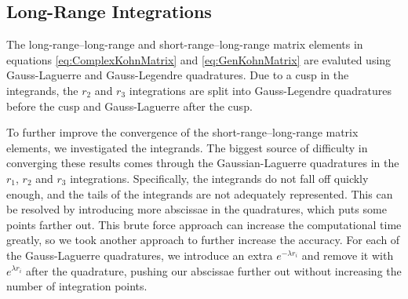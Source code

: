 \documentclass[preprint,showpacs,preprintnumbers,amsmath,amssymb]{revtex4}
\begin{document}
\subsection{Long-Range Integrations}
\label{sec:LongInt}
The long-range--long-range and short-range--long-range matrix elements in equations \ref{eq:ComplexKohnMatrix} and \ref{eq:GenKohnMatrix} are evaluted using Gauss-Laguerre and Gauss-Legendre quadratures. Due to a cusp in the integrands, the $r_2$ and $r_3$ integrations are split into Gauss-Legendre quadratures before the cusp and Gauss-Laguerre after the cusp. 

To further improve the convergence of the short-range--long-range matrix elements, we investigated the integrands. The biggest source of difficulty in converging these results comes through the Gaussian-Laguerre quadratures in the $r_1$, $r_2$ and $r_3$ integrations. Specifically, the integrands do not fall off quickly enough, and the tails of the integrands are not adequately represented. This can be resolved by introducing more abscissae in the quadratures, which puts some points farther out. This brute force approach can increase the computational time greatly, so we took another approach to further increase the accuracy. For each of the Gauss-Laguerre quadratures, we introduce an extra $e^{-\lambda r_i}$ and remove it with $e^{\lambda r_i}$ after the quadrature, pushing our abscissae further out without increasing the number of integration points.
\end{document}

